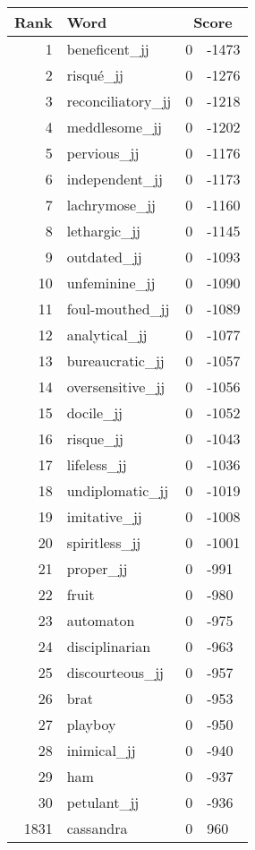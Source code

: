 \begin{longtable}[!htbp]{| rlr@{.}l |}
    \hline
    \textbf{Rank} & \textbf{Word} & \multicolumn{2}{c|}{\textbf{Score}} \\
    \hline
    \endhead
    1 & beneficent\_jj & 0 & -1473 \\
    2 & risqué\_jj & 0 & -1276 \\
    3 & reconciliatory\_jj & 0 & -1218 \\
    4 & meddlesome\_jj & 0 & -1202 \\
    5 & pervious\_jj & 0 & -1176 \\
    6 & independent\_jj & 0 & -1173 \\
    7 & lachrymose\_jj & 0 & -1160 \\
    8 & lethargic\_jj & 0 & -1145 \\
    9 & outdated\_jj & 0 & -1093 \\
    10 & unfeminine\_jj & 0 & -1090 \\
    11 & foul-mouthed\_jj & 0 & -1089 \\
    12 & analytical\_jj & 0 & -1077 \\
    13 & bureaucratic\_jj & 0 & -1057 \\
    14 & oversensitive\_jj & 0 & -1056 \\
    15 & docile\_jj & 0 & -1052 \\
    16 & risque\_jj & 0 & -1043 \\
    17 & lifeless\_jj & 0 & -1036 \\
    18 & undiplomatic\_jj & 0 & -1019 \\
    19 & imitative\_jj & 0 & -1008 \\
    20 & spiritless\_jj & 0 & -1001 \\
    21 & proper\_jj & 0 & -991 \\
    22 & fruit & 0 & -980 \\
    23 & automaton & 0 & -975 \\
    24 & disciplinarian & 0 & -963 \\
    25 & discourteous\_jj & 0 & -957 \\
    26 & brat & 0 & -953 \\
    27 & playboy & 0 & -950 \\
    28 & inimical\_jj & 0 & -940 \\
    29 & ham & 0 & -937 \\
    30 & petulant\_jj & 0 & -936 \\
    1831 & cassandra & 0 & 960 \\

\end{longtable}

